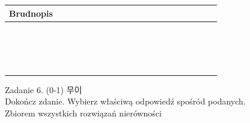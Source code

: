 \documentclass[10pt]{article}
\begin{document}
\begin{center}
\begin{tabular}{|c|c|c|c|c|c|c|c|c|c|c|c|c|c|c|c|c|c|c|c|c|c|c|}
\hline
\multicolumn{4}{|l|}{Brudnopis} &  &  &  &  &  &  &  &  &  &  &  &  &  &  &  &  &  &  &  \\
\hline
 &  &  &  &  &  &  &  &  &  &  &  &  &  &  &  &  &  &  &  &  &  &  \\
\hline
 &  &  &  &  &  &  &  &  &  &  &  &  &  &  &  &  &  &  &  &  &  &  \\
\hline
 &  &  &  &  &  &  &  &  &  &  &  &  &  &  &  &  &  &  &  &  &  &  \\
\hline
 &  &  &  &  &  &  &  &  &  &  &  &  &  &  &  &  &  &  &  &  &  &  \\
\hline
 &  &  &  &  &  &  &  &  &  &  &  &  &  &  &  &  &  &  &  &  &  &  \\
\hline
 &  &  &  &  &  &  &  &  &  &  &  &  &  &  &  &  &  &  &  &  &  &  \\
\hline
 &  &  &  &  &  &  &  &  &  &  &  &  &  &  &  &  &  &  &  &  &  &  \\
\hline
 &  &  &  &  &  &  &  &  &  &  &  &  &  &  &  &  &  &  &  &  &  &  \\
\hline
 &  &  &  &  &  &  &  &  &  &  &  &  &  &  &  &  &  &  &  &  &  &  \\
\hline
 &  &  &  &  &  &  &  &  &  &  &  &  &  &  &  &  &  &  &  &  &  &  \\
\hline
 &  &  &  &  &  &  &  &  &  &  &  &  &  &  &  &  &  &  &  &  &  &  \\
\hline
 &  &  &  &  &  &  &  &  &  &  &  &  &  &  &  &  &  &  &  &  &  &  \\
\hline
 &  &  &  &  &  &  &  &  &  &  &  &  &  &  &  &  &  &  &  &  &  &  \\
\hline
 &  &  &  &  &  &  &  &  &  &  &  &  &  &  &  &  &  &  &  &  &  &  \\
\hline
 &  &  &  &  &  &  &  &  &  &  &  &  &  &  &  &  &  &  &  &  &  &  \\
\hline
 &  &  &  &  &  &  &  &  &  &  &  &  &  &  &  &  &  &  &  &  &  &  \\
\hline
 &  &  &  &  &  &  &  &  &  &  &  &  &  &  &  &  &  &  &  &  &  &  \\
\hline
\end{tabular}
\end{center}

Zadanie 6. (0-1) 무이\\
Dokończ zdanie. Wybierz właściwą odpowiedź spośród podanych.\\
Zbiorem wszystkich rozwiązań nierówności
\end{document}
